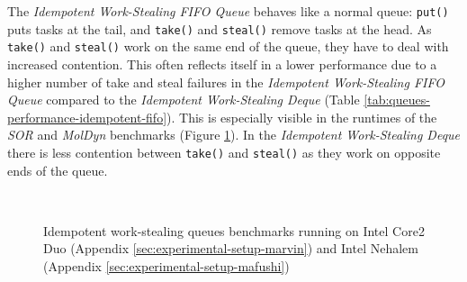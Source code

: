 The \emph{Idempotent Work-Stealing FIFO Queue} behaves like a normal
queue: \lstinline!put()! puts tasks at the tail, and
\lstinline!take()!  and \lstinline!steal()! remove tasks at the
head. As \lstinline!take()! and \lstinline!steal()! work on the same
end of the queue, they have to deal with increased contention. This
often reflects itself in a lower performance due to a higher number of
take and steal failures in the \emph{Idempotent Work-Stealing FIFO
  Queue} compared to the \emph{Idempotent Work-Stealing Deque} (Table
\ref{tab:queues-performance-idempotent-fifo}). This is especially
visible in the runtimes of the \emph{SOR} and \emph{MolDyn} benchmarks
(Figure \ref{fig:queues-performance-idempotent}). In the
\emph{Idempotent Work-Stealing Deque} there is less contention between
\lstinline!take()! and \lstinline!steal()! as they work on opposite
ends of the queue.

\begin{figure}[!htb]
  \centering
  \\
  \caption[Idempotent work-stealing queues benchmarks]{Idempotent
    work-stealing queues benchmarks running on Intel Core2 Duo
    (Appendix \ref{sec:experimental-setup-marvin}) and Intel Nehalem
    (Appendix \ref{sec:experimental-setup-mafushi})}
  \label{fig:queues-performance-idempotent}
\end{figure}

